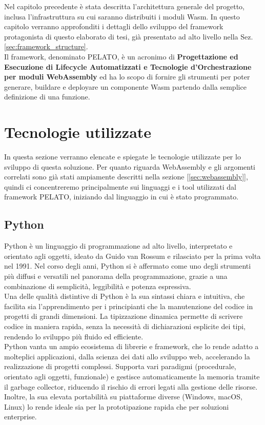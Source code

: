 
Nel capitolo precedente è stata descritta l'architettura generale del progetto, inclusa l'infrastruttura su cui saranno distribuiti i moduli Wasm. In questo capitolo verranno approfonditi i dettagli dello sviluppo del framework protagonista di questo elaborato di tesi, già presentato ad alto livello nella Sez. \ref{sec:framework_structure}.\\  
Il framework, denominato PELATO, è un acronimo di \textbf{Progettazione ed Esecuzione di Lifecycle Automatizzati e Tecnologie d'Orchestrazione per moduli WebAssembly} ed ha lo scopo di fornire gli strumenti per poter generare, buildare e deployare un componente Wasm partendo dalla semplice definizione di una funzione.\\

\section{Tecnologie utilizzate}

In questa sezione verranno elencate e spiegate le tecnologie utilizzate per lo sviluppo di questa soluzione. Per quanto riguarda WebAssembly e gli argomenti correlati sono già stati ampiamente descritti nella sezione [\ref{sec:webassembly}], quindi ci concentreremo principalmente sui linguaggi e i tool utilizzati dal framework PELATO, iniziando dal linguaggio in cui è stato programmato.

\subsection{Python}

Python è un linguaggio di programmazione ad alto livello, interpretato e orientato agli oggetti, ideato da Guido van Rossum e rilasciato per la prima volta nel 1991. Nel corso degli anni, Python si è affermato come uno degli strumenti più diffusi e versatili nel panorama della programmazione, grazie a una combinazione di semplicità, leggibilità e potenza espressiva.\\
Una delle qualità distintive di Python è la sua sintassi chiara e intuitiva, che facilita sia l'apprendimento per i principianti che la manutenzione del codice in progetti di grandi dimensioni. La tipizzazione dinamica permette di scrivere codice in maniera rapida, senza la necessità di dichiarazioni esplicite dei tipi, rendendo lo sviluppo più fluido ed efficiente.\\
Python vanta un ampio ecosistema di librerie e framework, che lo rende adatto a molteplici applicazioni, dalla scienza dei dati allo sviluppo web, accelerando la realizzazione di progetti complessi. Supporta vari paradigmi (procedurale, orientato agli oggetti, funzionale) e gestisce automaticamente la memoria tramite il garbage collector, riducendo il rischio di errori legati alla gestione delle risorse. Inoltre, la sua elevata portabilità su piattaforme diverse (Windows, macOS, Linux) lo rende ideale sia per la prototipazione rapida che per soluzioni enterprise.

